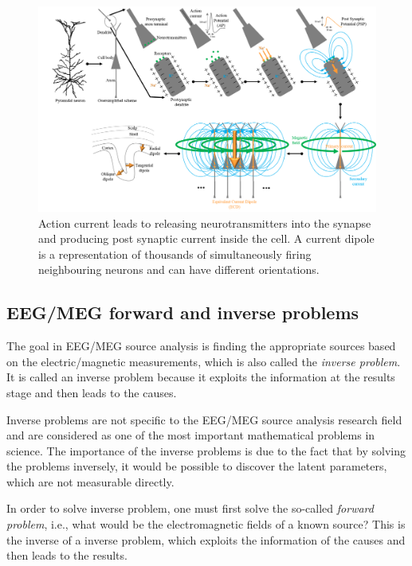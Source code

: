 \begin{figure}[htpb]
\centering
\includegraphics[width=1\textwidth]{images/ECD.png} %
\caption{Action current leads to releasing neurotransmitters into the synapse and producing post synaptic current inside the cell. A current dipole is a representation of thousands of simultaneously firing neighbouring neurons and can have different 
orientations.}
\label{fig:ECD}
\end{figure}
\FloatBarrier
\subsection{EEG/MEG forward and inverse problems}
\label{sec:ForwardInverseProblem} 
The goal in EEG/MEG source analysis is finding the appropriate sources based on the electric/magnetic measurements, which is also called the \emph{inverse problem}.
It is called an inverse problem because it exploits the information at the results stage and then leads to the causes.

Inverse problems are not specific to the EEG/MEG source analysis research field and are considered as one of the most important mathematical problems in science.
The importance of the inverse problems is due to the fact that by solving the problems inversely, it would be possible to discover the latent parameters, which are not measurable directly.

In order to solve inverse problem, one must first solve the so-called \emph{forward problem}, i.e., what would be the electromagnetic fields of a known source?
This is the inverse of a inverse problem, which exploits the information of the causes and then leads to the results.

